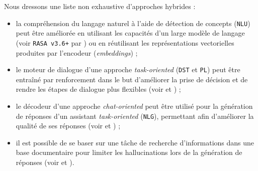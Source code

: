 		\begin{leftBarExamples}
			Nous dressons une liste non exhaustive d'approches hybrides :
			\begin{itemize}
				\item la compréhension du langage naturel à l'aide de détection de concepts (\texttt{NLU}) peut être améliorée en utilisant les capacités d'un large modèle de langage (voir \texttt{RASA v3.6+} par \cite{bocklisch-etal:2017:rasa-open-source}) ou en réutilisant les représentations vectorielles produites par l'encodeur (\textit{embeddings}) ;
				\item le moteur de dialogue d'une approche \textit{task-oriented} (\texttt{DST} et \texttt{PL}) peut être entraîné par renforcement dans le but d'améliorer la prise de décision et de rendre les étapes de dialogue plus flexibles (voir \cite{chen-etal:2017:survey-dialogue-systems} et \cite{brabra-etal:2022:dialogue-management-conversational}) ;
				\item le décodeur d'une approche \textit{chat-oriented} peut être utilisé pour la génération de réponses d'un assistant \textit{task-oriented} (\texttt{NLG}), permettant afin d'améliorer la qualité de ses réponses (voir \cite{gao-etal:2018:neural-approaches-conversational} et \cite{chen-etal:2017:survey-dialogue-systems}) ;
				\item il est possible de se baser sur une tâche de recherche d'informations dans une base documentaire pour limiter les hallucinations lors de la génération de réponses (voir \cite{shuster-etal:2021:retrieval-augmentation-reduces} et \cite{zhang-etal:2016:neural-information-retrieval}).
			\end{itemize}
		\end{leftBarExamples}